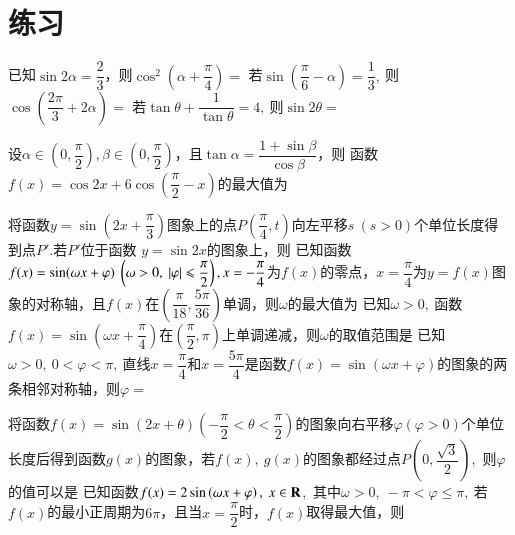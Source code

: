 \section{练习}
\begin{questions}


\qs 已知$\sin 2\alpha=\dfrac{2}{3}$，则$\cos^2\left(\alpha+\dfrac{\pi}{4}\right)=$\xx
{}
\qs 若$ \sin \left(\dfrac{\pi}{6}-\alpha\right)=\dfrac{1}{3},\  $则$ \cos \left(\dfrac{2\pi}{3}+2\alpha\right)= $\xx
{}
\qs 若$ \tan \theta+\dfrac{1}{\tan \theta} =4,\ $则$ \sin 2\theta =$\xx
{}


\question 设$\alpha \in \left(0,\dfrac{\pi}{2}\right),\beta \in \left(0,\dfrac{\pi}{2}\right)$，且$\tan \alpha =\dfrac{1+\sin \beta}{\cos \beta}$，则\xx
{}
\question 函数$f(x)=\cos 2x+6\cos \left(\dfrac{\pi}{2}-x\right)$的最大值为\xx
{}

\qs 将函数$ y=\sin\left(2x+\dfrac{\pi}{3}\right) $图象上的点$ P\left(\dfrac{\pi}{4},t\right) $向左平移$ s\ (s>0) $个单位长度得到点$ P' $.若$ P' $位于函数 $ y=\sin 2x $的图象上，则\xx
{}
\question 已知函数$f(x)=\sin(\omega x+\varphi)\ \left(\omega>0,\ \abs{\varphi}\le \dfrac{\pi}{2}\right),x=-\dfrac{\pi}{4}$为$f(x)$的零点，$x=\dfrac{\pi}{4}$为$y=f(x)$图象的对称轴，且$f(x)$在$\left(\dfrac{\pi}{18},\dfrac{5\pi}{36}\right)$单调，则$\omega$的最大值为\xx
{}
\qs 已知$ \omega>0,\  $函数$f(x)=\sin \left(\omega x+\dfrac{\pi}{4}\right)$在$\left(\dfrac{\pi}{2},\pi\right)  $上单调递减，则$ \omega $的取值范围是\xx
\onech{$ \left[\dfrac{1}{2},\dfrac{5}{4}\right] $}{$ \left[\dfrac{1}{2},\dfrac{3}{4}\right] $}{$ \left(0,\dfrac{1}{2}\right] $}{$ \left(0,2\right] $}
\qs 已知$ \omega>0,\ 0<\varphi <\pi,\  $直线$ x=\dfrac{\pi}{4} $和$ x=\dfrac{5\pi}{4} $是函数$f(x)=\sin (\omega x+\varphi)$的图象的两条相邻对称轴，则$ \varphi= $\xx
{}

\qs 将函数$f(x)=\sin (2x+\theta)\left(-\dfrac{\pi}{2}<\theta<\dfrac{\pi}{2}\right)$的图象向右平移$ \varphi(\varphi>0) $个单位长度后得到函数$g(x)$的图象，若$f(x),\ g(x)$的图象都经过点$ P\left(0,\dfrac{\sqrt{3}}{2}\right) $,\ 则$ \varphi $的值可以是\xx
{}
\qs 已知函数$f(x)=2\sin \left(\omega x+\varphi\right),\ x \in\mathbf{R}$,\ 其中$ \omega>0,\ -\pi <\varphi\le \pi ,\  $若$f(x)$的最小正周期为$ 6\pi  $，且当$ x=\dfrac{\pi}{2} $时，$f(x)$取得最大值，则\xx
{}


\end{questions}
